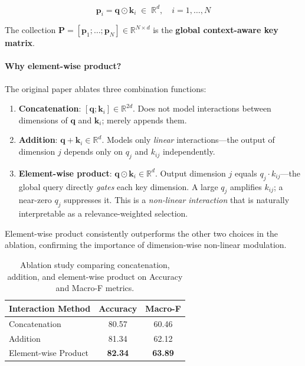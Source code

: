 \documentclass[11pt,a4paper]{article}
\newcommand{\mat}[1]{\mathbf{#1}}
\newcommand{\vect}[1]{\mathbf{#1}}
\newcommand{\R}{\mathbb{R}}
\newcommand{\odotop}{\odot}
\theoremstyle{definition}
\begin{document}
\begin{equation*}
  \vect{p}_i = \vect{q} \odotop \vect{k}_i \;\in\; \R^{d}, \quad i=1,\ldots,N
\end{equation*}

The collection $\mat{P}=[\vect{p}_1;\ldots;\vect{p}_N]\in\R^{N\times d}$ is the
\textbf{global context-aware key matrix}.

\paragraph{Why element-wise product?}
The original paper ablates three combination functions:
\begin{enumerate}[noitemsep]
  \item \textbf{Concatenation}: $[\vect{q};\vect{k}_i]\in\R^{2d}$. Does not model
        interactions between dimensions of $\vect{q}$ and $\vect{k}_i$; merely appends them.
  \item \textbf{Addition}: $\vect{q}+\vect{k}_i\in\R^{d}$. Models only \emph{linear}
        interactions---the output of dimension $j$ depends only on $q_j$ and $k_{ij}$
        independently.
  \item \textbf{Element-wise product}: $\vect{q}\odotop\vect{k}_i\in\R^{d}$.
        Output dimension $j$ equals $q_j\cdot k_{ij}$---the global query directly \emph{gates}
        each key dimension. A large $q_j$ amplifies $k_{ij}$; a near-zero $q_j$ suppresses it.
        This is a \emph{non-linear interaction} that is naturally interpretable as a
        relevance-weighted selection.
\end{enumerate}

Element-wise product consistently outperforms the other two choices in the ablation,
confirming the importance of dimension-wise non-linear modulation.

\begin{table}[H]
\centering
\caption{Ablation study comparing concatenation, addition, and element-wise product on Accuracy and Macro-F metrics.}
\label{tab:ablation}
\begin{tabular}{lcc}
\toprule
\textbf{Interaction Method} & \textbf{Accuracy} & \textbf{Macro-F} \\
\midrule
Concatenation & 80.57 & 60.46 \\
Addition & 81.34 & 62.12 \\
Element-wise Product & \textbf{82.34} & \textbf{63.89} \\
\bottomrule
\end{tabular}
\end{table}
\end{document}
